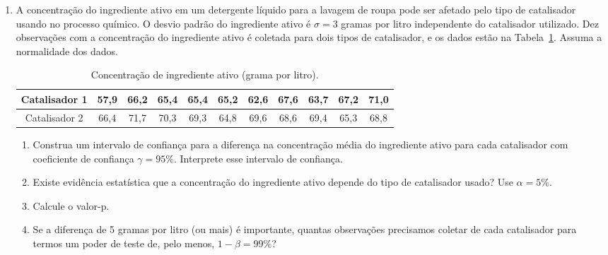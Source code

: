 \documentclass[8pt, a4paper]{article}
\begin{document}
\begin{enumerate}
	\item A concentração do ingrediente ativo em um detergente líquido para a lavagem de roupa pode ser afetado pelo tipo de catalisador usando no processo químico. O desvio padrão do ingrediente ativo é $\sigma = 3$ gramas por litro independente do catalisador utilizado. Dez observações com a concentração do ingrediente ativo é coletada para dois tipos de catalisador, e os dados estão na Tabela~\ref{tab:concentracao-detergente}. Assuma a normalidade dos dados.
	\begin{table}[ht]
		\centering
		\begin{tabular}{c|cccccccccc}
			\toprule[0.05cm]
			Catalisador 1 & 57,9 & 66,2 & 65,4 & 65,4 & 65,2 & 62,6 & 67,6 & 63,7 & 67,2 & 71,0 \\  \midrule[0.025cm]
			Catalisador 2 & 66,4 & 71,7 & 70,3 & 69,3 & 64,8 & 69,6 & 68,6 & 69,4 & 65,3 & 68,8 \\ 
			\bottomrule[0.05cm]
		\end{tabular}
		\caption{Concentração de ingrediente ativo (grama por litro).} 
		\label{tab:concentracao-detergente}
	\end{table}
	\begin{enumerate}
		\item Construa um intervalo de confiança para a diferença na concentração média do ingrediente ativo para cada catalisador com coeficiente de confiança $\gamma = 95\%$. Interprete esse intervalo de confiança.
		\item Existe evidência estatística que a concentração do ingrediente ativo depende do tipo de catalisador usado? Use $\alpha = 5\%$.
		\item Calcule o valor-p.
		\item Se a diferença de 5 gramas por litro (ou mais) é importante, quantas observações precisamos coletar de cada catalisador para termos um poder de teste de, pelo menos, $1-\beta=99\%$?
	\end{enumerate}


\end{enumerate}
\end{document}
